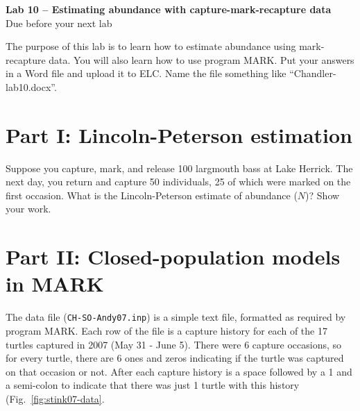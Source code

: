 \documentclass[12pt]{article}
\begin{document}
{
  \Large
  \centering
  {\bf Lab 10 -- Estimating abundance with
    capture-mark-recapture data} \\
  Due before your next lab \par
}

\vspace{10pt}


The purpose of this lab is to learn how to %
estimate abundance using mark-recapture data. You will also learn how
to use program MARK. Put your answers in a Word file and upload it to
ELC. Name the file something like ``Chandler-lab10.docx''. 





\section*{\large Part I: Lincoln-Peterson estimation}
Suppose you capture, mark, and release 100 largmouth bass at Lake
Herrick. The next day, you return and capture 50 individuals, 25 of
which were marked on the first occasion. What is the Lincoln-Peterson
estimate of abundance ($N$)? Show your work.





\section*{\large  Part II: Closed-population models in MARK}
The data file (\verb+CH-SO-Andy07.inp+) is a simple text file, formatted
as required by program MARK. Each row of the file is a capture history
for each of the 17 turtles captured in 2007 (May 31 - June 5). There
were 6 capture occasions, so for every turtle, there are 6 ones and
zeros indicating if the turtle was captured on that occasion or
not. After each capture history is a space followed by a 1 and a
semi-colon to indicate that there was just 1 turtle with this history
(Fig.~\ref{fig:stink07-data}.
\end{document}
